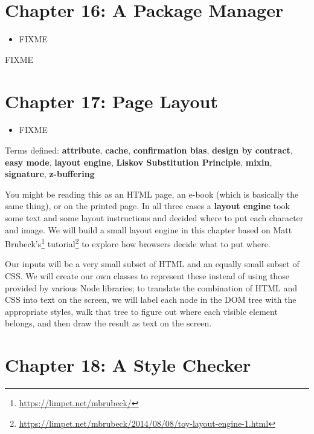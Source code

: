 \documentclass{scrbook}
\newcommand{\glossref}[1]{\textbf{#1}}
\newcommand{\hreffoot}[2]{{#1}\footnote{\href{#2}{#2}}}
\begin{document}
\chapter{Chapter 16: A Package Manager}\label{packman}

\begin{itemize}

\item FIXME

\end{itemize}


FIXME

\chapter{Chapter 17: Page Layout}\label{layout}

\begin{itemize}

\item FIXME

\end{itemize}


\noindent 
    Terms defined:
    \glossref{attribute}, \glossref{cache}, \glossref{confirmation bias}, \glossref{design by contract}, \glossref{easy mode}, \glossref{layout engine}, \glossref{Liskov Substitution Principle}, \glossref{mixin}, \glossref{signature}, \glossref{z-buffering}



You might be reading this as an HTML page,
an e-book (which is basically the same thing),
or on the printed page.
In all three cases
a \glossref{layout engine} took some text and some layout instructions
and decided where to put each character and image.
We will build a small layout engine in this chapter
based on \hreffoot{Matt Brubeck's}{https://limpet.net/mbrubeck/} \hreffoot{tutorial}{https://limpet.net/mbrubeck/2014/08/08/toy-layout-engine-1.html}
to explore how browsers decide what to put where.


Our inputs will be a very small subset of HTML and an equally small subset of CSS.
We will create our own classes to represent these
instead of using those provided by various Node libraries;
to translate the combination of HTML and CSS into text on the screen,
we will label each node in the DOM tree with the appropriate styles,
walk that tree to figure out where each visible element belongs,
and then draw the result as text on the screen.


\chapter{Chapter 18: A Style Checker}\label{linter}
\end{document}
